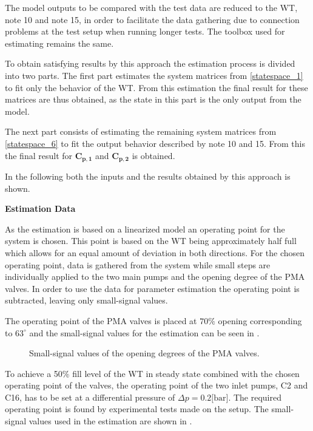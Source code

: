The model outputs to be compared with the test data are reduced to the WT, note 10 and note 15, in order to facilitate the data gathering due to connection problems at the test setup when running longer tests. The toolbox used for estimating remains the same. 

To obtain satisfying results by this approach the estimation process is divided into two parts. 
The first part estimates the system matrices from \eqref{statespace_1} to fit only the behavior of the WT. From this estimation the final result for these matrices are thus obtained, as the state in this part is the only output from the model.

The next part consists of estimating the remaining system matrices from \eqref{statespace_6} to fit the output behavior described by note 10 and 15. From this the final result for $ \bm{C_{p,1}} $ and $ \bm{C_{p,2}}$ is obtained. 

In the following both the inputs and the results obtained by this approach is shown.

\textbf{Estimation Data}

As the estimation is based on a linearized model an operating point for the system is chosen. This point is based on the WT being approximately half full which allows for an equal amount of deviation in both directions. For the chosen operating point, data is gathered from the system while small steps are individually applied to the two main pumps and the opening degree of the PMA valves. In order to use the data for parameter estimation the operating point is subtracted, leaving only small-signal values.  

The operating point of the PMA valves is placed at $70\%$ opening corresponding to $63^{\circ}$ and the small-signal values for the estimation can be seen in .

\begin{figure}[H]
\centering
 
\caption{Small-signal values of the opening degrees of the PMA valves.}
\label{fig:est_OD_data_final}
\end{figure}

To achieve a 50\% fill level of the WT in steady state combined with the chosen operating point of the valves, the operating point of the two inlet pumps, C2 and C16, has to be set at a differential pressure of $\Delta p = 0.2 \text{[bar]}$. The required operating point is found by experimental tests made on the setup. The small-signal values used in the estimation are shown in . 

